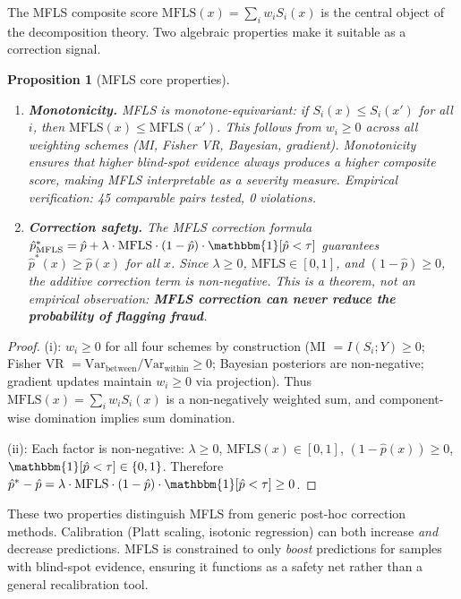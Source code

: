 \documentclass[journal]{IEEEtran}
\newcommand{\ind}{\mathbbm{1}}
\newtheorem{proposition}{Proposition}
\begin{document}
The MFLS composite score $\text{MFLS}(x) = \sum_i w_i S_i(x)$ is the central object of the decomposition theory.  Two algebraic properties make it suitable as a correction signal.

\begin{proposition}[MFLS core properties]
\label{prop:mfls-core}
\begin{enumerate}[label=(\roman*)]
    \item \textbf{Monotonicity.}\; MFLS is monotone-equivariant: if $S_i(x) \leq S_i(x')$ for all $i$, then $\text{MFLS}(x) \leq \text{MFLS}(x')$.  This follows from $w_i \geq 0$ across all weighting schemes (MI, Fisher VR, Bayesian, gradient).  Monotonicity ensures that higher blind-spot evidence always produces a higher composite score, making MFLS interpretable as a \emph{severity measure}.  Empirical verification: 45 comparable pairs tested, 0 violations.
    \item \textbf{Correction safety.}\; The MFLS correction formula $\hat{p}^*_{\text{MFLS}} = \hat{p} + \lambda \cdot \text{MFLS} \cdot (1-\hat{p}) \cdot \ind[\hat{p} < \tau]$ guarantees $\hat{p}^*(x) \geq \hat{p}(x)$ for all $x$.  Since $\lambda \geq 0$, $\text{MFLS} \in [0,1]$, and $(1-\hat{p}) \geq 0$, the additive correction term is non-negative.  This is a theorem, not an empirical observation: \textbf{MFLS correction can never reduce the probability of flagging fraud}.
\end{enumerate}
\end{proposition}

\begin{proof}
(i): $w_i \geq 0$ for all four schemes by construction (MI $= I(S_i; Y) \geq 0$; Fisher VR $= \text{Var}_{\text{between}} / \text{Var}_{\text{within}} \geq 0$; Bayesian posteriors are non-negative; gradient updates maintain $w_i \geq 0$ via projection).  Thus $\text{MFLS}(x) = \sum_i w_i S_i(x)$ is a non-negatively weighted sum, and component-wise domination implies sum domination.

(ii): Each factor is non-negative: $\lambda \geq 0$, $\text{MFLS}(x) \in [0,1]$, $(1-\hat{p}(x)) \geq 0$, $\ind[\hat{p} < \tau] \in \{0, 1\}$.  Therefore $\hat{p}^* - \hat{p} = \lambda \cdot \text{MFLS} \cdot (1-\hat{p}) \cdot \ind[\hat{p} < \tau] \geq 0$.
\end{proof}

These two properties distinguish MFLS from generic post-hoc correction methods.  Calibration (Platt scaling, isotonic regression) can both increase \emph{and} decrease predictions.  MFLS is constrained to only \emph{boost} predictions for samples with blind-spot evidence, ensuring it functions as a safety net rather than a general recalibration tool.
\end{document}
